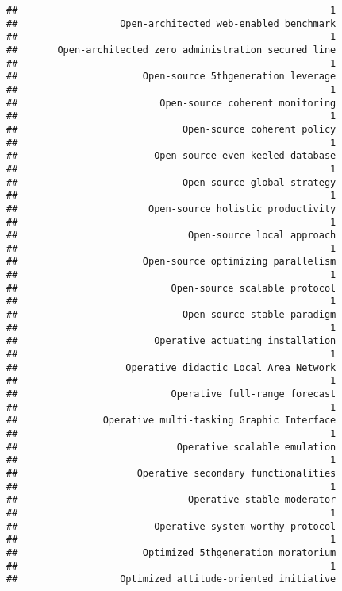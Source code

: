 \documentclass[
]{article}
\begin{document}
\begin{verbatim}
##                                                       1 
##                  Open-architected web-enabled benchmark 
##                                                       1 
##       Open-architected zero administration secured line 
##                                                       1 
##                      Open-source 5thgeneration leverage 
##                                                       1 
##                         Open-source coherent monitoring 
##                                                       1 
##                             Open-source coherent policy 
##                                                       1 
##                        Open-source even-keeled database 
##                                                       1 
##                             Open-source global strategy 
##                                                       1 
##                       Open-source holistic productivity 
##                                                       1 
##                              Open-source local approach 
##                                                       1 
##                      Open-source optimizing parallelism 
##                                                       1 
##                           Open-source scalable protocol 
##                                                       1 
##                             Open-source stable paradigm 
##                                                       1 
##                        Operative actuating installation 
##                                                       1 
##                   Operative didactic Local Area Network 
##                                                       1 
##                           Operative full-range forecast 
##                                                       1 
##               Operative multi-tasking Graphic Interface 
##                                                       1 
##                            Operative scalable emulation 
##                                                       1 
##                     Operative secondary functionalities 
##                                                       1 
##                              Operative stable moderator 
##                                                       1 
##                        Operative system-worthy protocol 
##                                                       1 
##                      Optimized 5thgeneration moratorium 
##                                                       1 
##                  Optimized attitude-oriented initiative 

\end{verbatim}
\end{document}
